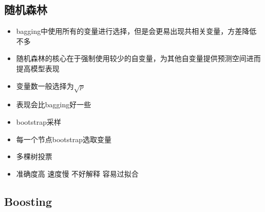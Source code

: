 \documentclass[]{book}
\providecommand{\tightlist}{%
  \setlength{\itemsep}{0pt}\setlength{\parskip}{0pt}}
\begin{document}
\subsection{随机森林}

\begin{itemize}
\tightlist
\item
  bagging中使用所有的变量进行选择，但是会更易出现共相关变量，方差降低不多
\item
  随机森林的核心在于强制使用较少的自变量，为其他自变量提供预测空间进而提高模型表现
\item
  变量数一般选择为\(\sqrt p\)
\item
  表现会比bagging好一些
\item
  bootstrap采样
\item
  每一个节点bootstrap选取变量
\item
  多棵树投票
\item
  准确度高 速度慢 不好解释 容易过拟合
\end{itemize}

\hypertarget{boosting}{%
\subsection{Boosting}\label{boosting}}
\end{document}
